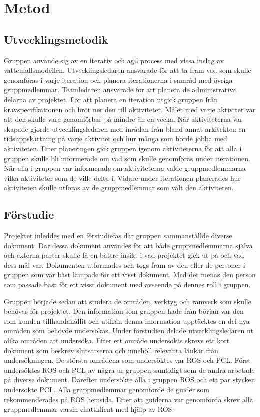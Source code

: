\chapter{Metod}
\label{cha:method}

\section{Utvecklingsmetodik}

Gruppen använde sig av en iterativ och agil process med vissa inslag av vattenfallsmodellen. Utvecklingsledaren ansvarade för att ta fram vad som skulle genomföras i varje iteration och planera iterationerna i samråd med övriga gruppmedlemmar. Teamledaren ansvarade för att planera de administrativa delarna av projektet. För att planera en iteration utgick gruppen från kravspecifikationen och bröt ner den till aktiviteter. Målet med varje aktivitet var att den skulle vara genomförbar på mindre än en vecka. När aktiviteterna var skapade gjorde utvecklingsledaren med inrådan från bland annat arkitekten en tidsuppskattning på varje aktivitet och hur många som borde jobba med aktiviteten. Efter planeringen gick gruppen igenom aktiviteterna för att alla i gruppen skulle bli informerade om vad som skulle genomföras under iterationen. När alla i gruppen var informerade om aktiviteterna valde gruppmedlemmarna vilka aktiviteter som de ville delta i. Vidare under iterationen planerades hur aktiviteten skulle utföras av de gruppmedlemmar som valt den aktiviteten.

\section{Förstudie}

Projektet inleddes med en förstudiefas där gruppen sammanställde diverse dokument. Där dessa dokument användes för att både gruppmedlemmarna själva och externa parter skulle få en bättre insikt i vad projektet gick ut på och vad dess mål var. Dokumenten utformades och togs fram av den eller de personer i gruppen som var bäst lämpade för ett visst dokument. Med det menas den person som passade bäst för ett visst dokument med avseende på dennes roll i gruppen.

Gruppen började sedan att studera de områden, verktyg och ramverk som skulle behövas för projektet. Den information som gruppen hade från början var den som kunden tillhandahållit och utifrån denna information upptäcktes en del nya områden som behövde undersökas. Under förstudien delade utvecklingsledaren ut olika områden att undersöka. Efter ett område undersökts skrevs ett kort dokument som beskrev slutsatserna och innehöll relevanta länkar från undersökningen. De största områdena som undersöktes var ROS och PCL. Först undersöktes ROS och PCL av några ur gruppen samtidigt som de andra arbetade på diverse dokument. Därefter undersökte alla i gruppen ROS och ett par stycken undersökte PCL. Alla gruppmedlemmar genomförde de guider som rekommenderades på ROS hemsida. Efter att guiderna var genomförda skrev alla gruppmedlemmar varsin chattklient med hjälp av ROS.

